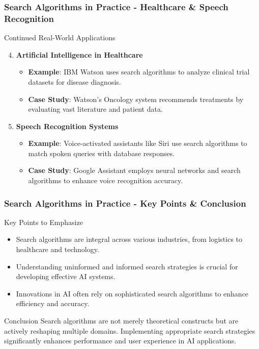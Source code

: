 \documentclass[aspectratio=169]{beamer}
\begin{document}
\begin{frame}[fragile]
    \frametitle{Search Algorithms in Practice - Healthcare & Speech Recognition}
    \begin{block}{Continued Real-World Applications}
        \begin{enumerate}
            \setcounter{enumi}{3}  %
            \item \textbf{Artificial Intelligence in Healthcare}
                \begin{itemize}
                    \item \textbf{Example}: IBM Watson uses search algorithms to analyze clinical trial datasets for disease diagnosis.
                    \item \textbf{Case Study}: Watson’s Oncology system recommends treatments by evaluating vast literature and patient data.
                \end{itemize}

            \item \textbf{Speech Recognition Systems}
                \begin{itemize}
                    \item \textbf{Example}: Voice-activated assistants like Siri use search algorithms to match spoken queries with database responses.
                    \item \textbf{Case Study}: Google Assistant employs neural networks and search algorithms to enhance voice recognition accuracy.
                \end{itemize}
        \end{enumerate}
    \end{block}
\end{frame}

\begin{frame}[fragile]
    \frametitle{Search Algorithms in Practice - Key Points & Conclusion}
    \begin{block}{Key Points to Emphasize}
        \begin{itemize}
            \item Search algorithms are integral across various industries, from logistics to healthcare and technology.
            \item Understanding uninformed and informed search strategies is crucial for developing effective AI systems.
            \item Innovations in AI often rely on sophisticated search algorithms to enhance efficiency and accuracy.
        \end{itemize}
    \end{block}
    
    \begin{block}{Conclusion}
        Search algorithms are not merely theoretical constructs but are actively reshaping multiple domains. 
        Implementing appropriate search strategies significantly enhances performance and user experience in AI applications.
    \end{block}
\end{frame}
\end{document}
